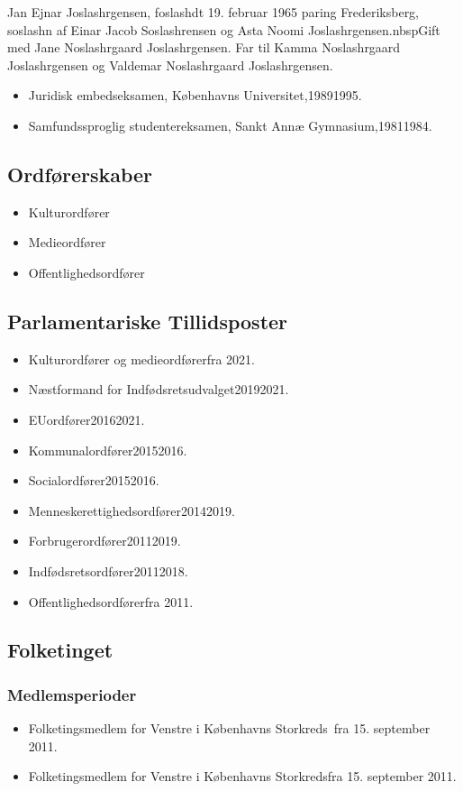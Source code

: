 \documentclass[11pt, a4paper]{awesome-cv}
\begin{document}
\makecvheader[R]
\makelettertitle
\begin{cvletter}
Jan Ejnar Joslashrgensen, foslashdt 19. februar 1965 paring Frederiksberg, soslashn af Einar Jacob Soslashrensen og Asta Noomi Joslashrgensen.nbspGift med Jane Noslashrgaard Joslashrgensen. Far til Kamma Noslashrgaard Joslashrgensen og Valdemar Noslashrgaard Joslashrgensen.

\begin{itemize}
\item Juridisk embedseksamen, Københavns Universitet,19891995.
\item Samfundssproglig studentereksamen, Sankt Annæ Gymnasium,19811984.
\end{itemize}
\subsection*{Ordførerskaber}
\begin{itemize}
\item Kulturordfører
\item Medieordfører
\item Offentlighedsordfører
\end{itemize}
\subsection*{Parlamentariske Tillidsposter}
\begin{itemize}
\item Kulturordfører og medieordførerfra 2021.
\item Næstformand for Indfødsretsudvalget20192021.
\item EUordfører20162021.
\item Kommunalordfører20152016.
\item Socialordfører20152016.
\item Menneskerettighedsordfører20142019.
\item Forbrugerordfører20112019.
\item Indfødsretsordfører20112018.
\item Offentlighedsordførerfra 2011.
\end{itemize}
\subsection*{Folketinget}
\subsubsection*{Medlemsperioder}
\begin{itemize}
\item Folketingsmedlem for Venstre i Københavns Storkreds fra 15. september 2011.
\item Folketingsmedlem for Venstre i Københavns Storkredsfra 15. september 2011.
\end{itemize}

\end{cvletter}
\end{document}
